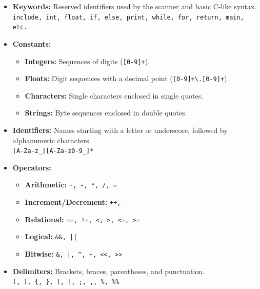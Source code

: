\documentclass{article}
\begin{document}
\begin{itemize}
    \item \textbf{Keywords:} Reserved identifiers used by the scanner and basic C-like syntax.
          \\ \texttt{include, int, float, if, else, print, while, for, return, main, etc.}

    \item \textbf{Constants:}
          \begin{itemize}
              \item \textbf{Integers:} Sequences of digits (\texttt{[0-9]+}).
              \item \textbf{Floats:} Digit sequences with a decimal point (\texttt{[0-9]+\textbackslash.[0-9]+}).
              \item \textbf{Characters:} Single characters enclosed in single quotes.
              \item \textbf{Strings:} Byte sequences enclosed in double quotes.
          \end{itemize}

    \item \textbf{Identifiers:} Names starting with a letter or underscore, followed by alphanumeric characters.
          \\ \texttt{[A-Za-z\_][A-Za-z0-9\_]*}

    \item \textbf{Operators:}
          \begin{itemize}
              \item \textbf{Arithmetic:} \texttt{+, -, *, /, =}
              \item \textbf{Increment/Decrement:} \texttt{++, --}
              \item \textbf{Relational:} \texttt{==, !=, <, >, <=, >=}
              \item \textbf{Logical:} \texttt{\&\&, ||}
              \item \textbf{Bitwise:} \texttt{\&, |, \^{}, \textasciitilde, <<, >>}
          \end{itemize}

    \item \textbf{Delimiters:} Brackets, braces, parentheses, and punctuation.
          \\ \texttt{(, ), \{, \}, [, ], ;, ,, \%, \%\%}
\end{itemize}
\end{document}
